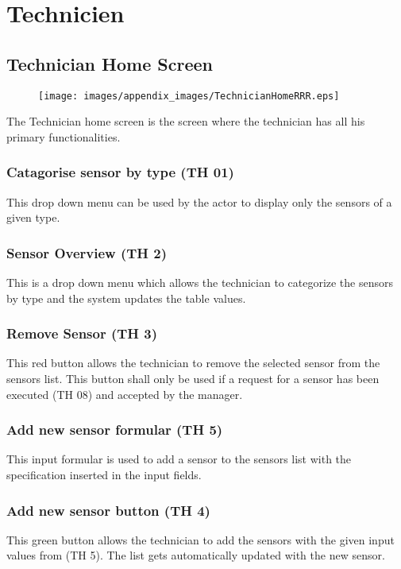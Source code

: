 \chapter{Technicien}
\label{chap:appendix_Technicien}

\section{Technician Home Screen}
\label{sec:appendix_Technician_Home_Screen}

\begin{figure}[H]
\texttt{[image: images/appendix\_images/TechnicianHomeRRR.eps]}
\end{figure}

The Technician home screen is the screen where the technician has all his
primary functionalities.


\subsection{Catagorise sensor by type (TH 01)}
This drop down menu can be used by the actor to display only the sensors of a
given type.


\subsection{Sensor Overview (TH 2)}
This is a drop down menu which allows the technician to categorize the sensors
by type and the system updates the table values.


\subsection{Remove Sensor (TH 3)}
This red button allows the technician to remove the selected sensor from the
sensors list. This button shall only be used if a request for a sensor has been
executed (TH 08) and accepted by the manager.

\subsection{Add new sensor formular (TH 5)}
This input formular is used to add a sensor to the sensors list with the
specification inserted in the input fields.

\subsection{Add new sensor button (TH 4)}
This green button allows the technician to add the sensors with the given input
values from (TH 5). The list gets automatically updated with the new sensor.

